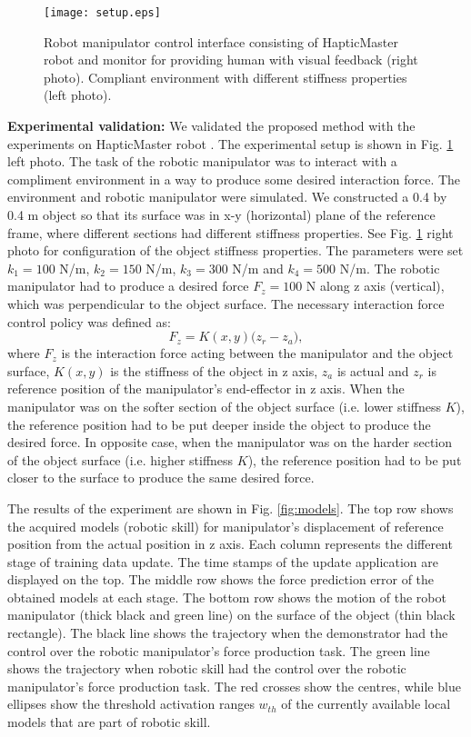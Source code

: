 \begin{figure}[!t]
	\centering
	\texttt{[image: setup.eps]}
	\caption{Robot manipulator control interface consisting of HapticMaster robot and monitor for providing human with visual feedback (right photo). Compliant environment with different stiffness properties (left photo).}
	\label{fig:setup}
\end{figure}

\textbf{Experimental validation:} We validated the proposed method with the experiments on HapticMaster robot \cite{Linde2002}. The experimental setup is shown in Fig. \ref{fig:setup} left photo. The task of the robotic manipulator was to interact with a compliment environment in a way to produce some desired interaction force. The environment and robotic manipulator were simulated. We constructed a 0.4 by 0.4 m object so that its surface was in x-y (horizontal) plane of the reference frame, where different sections had different stiffness properties. See Fig. \ref{fig:setup} right photo for configuration of the object stiffness properties. The parameters were set $k_1=100$ N/m, $k_2=150$ N/m, $k_3=300$ N/m and $k_4=500$ N/m. The robotic manipulator had to produce a desired force $F_z=100$ N along z axis (vertical), which was perpendicular to the object surface. The necessary interaction force control policy was defined as:
\begin{equation}
F_{z} = K(x,y) \big(z_r-z_a\big),\label{en:robotimp}
\end{equation}
where $F_{z}$ is the interaction force acting between the manipulator and the object surface, $K(x,y)$ is the stiffness of the object in z axis, $z_a$ is actual and $z_r$ is reference position of the manipulator's end-effector in z axis. When the manipulator was on the softer section of the object surface (i.e. lower stiffness $K$), the reference position had to be put deeper inside the object to produce the desired force. In opposite case, when the manipulator was on the harder section of the object surface (i.e. higher stiffness $K$), the reference position had to be put closer to the surface to produce the same desired force.

The results of the experiment are shown in Fig. \ref{fig:models}. The top row shows the acquired models (robotic skill) for manipulator's displacement of reference position from the actual position in z axis. Each column represents the different stage of training data update. The time stamps of the update application are displayed on the top. The middle row shows the force prediction error of the obtained models at each stage. The bottom row shows the motion of the robot manipulator (thick black and green line) on the surface of the object (thin black rectangle). The black line shows the trajectory when the demonstrator had the control over the robotic manipulator's force production task. The green line shows the trajectory when robotic skill had the control over the robotic manipulator's force production task. The red crosses show the centres, while blue ellipses show the threshold activation ranges $w_{th}$ of the currently available local models that are part of robotic skill.

